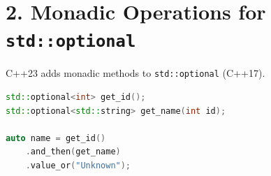 \hypertarget{monadic-operations-for-stdoptional}{%
\section{\texorpdfstring{2. Monadic Operations for
\texttt{std::optional}}{2. Monadic Operations for std::optional}}\label{monadic-operations-for-stdoptional}}

C++23 adds monadic methods to \passthrough{\lstinline!std::optional!}
(C++17).

\begin{lstlisting}[language={C++}]
std::optional<int> get_id();
std::optional<std::string> get_name(int id);

auto name = get_id()
    .and_then(get_name)
    .value_or("Unknown");
\end{lstlisting}
